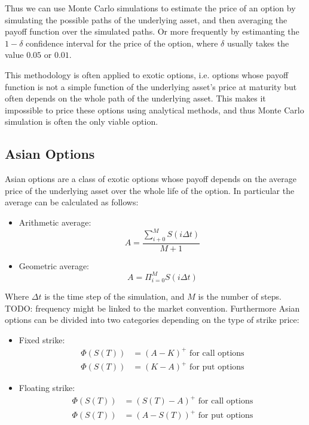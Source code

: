 Thus we can use Monte Carlo simulations to estimate the price of an option by
simulating the possible paths of the underlying asset, and then averaging the
payoff function over the simulated paths. Or more frequently by estimanting
the $1-\delta$ confidence interval for the price of the option, where $\delta$
usually takes the value $0.05$ or $0.01$.

This methodology is often applied to exotic options, i.e. options whose payoff
function is not a simple function of the underlying asset's price at maturity
but often depends on the whole path of the underlying asset. This makes it
impossible to price these options using analytical methods, and thus Monte
Carlo simulation is often the only viable option.

\subsection*{Asian Options}
Asian options are a class of exotic options whose payoff depends on the average
price of the underlying asset over the whole life of the option. In particular
the average can be calculated as follows:

\begin{itemize}
    \item Arithmetic average: \[ A = \frac{\sum^M_{i+0} S(i\Delta t)}{M+1} \]
    \item Geometric average: \[ A = \Pi_{i=0}^M S(i\Delta t) \]
\end{itemize}

Where $\Delta t$ is the time step of the simulation, and $M$ is the number of
steps. TODO: frequency might be linked to the market convention.
Furthermore Asian options can be divided into two categories depending on the
type of strike price:

\begin{itemize}
    \item Fixed strike: \begin{align*}
        \Phi(S(T)) & = (A - K)^+ \text{ for call options} \\
        \Phi(S(T)) & = (K - A)^+ \text{ for put options}
    \end{align*}
    \item Floating strike: \begin{align*}
    \Phi(S(T)) & = (S(T)-A)^+ \text{ for call options} \\
    \Phi(S(T)) & = (A-S(T))^+ \text{ for put options}
\end{align*}
\end{itemize}

